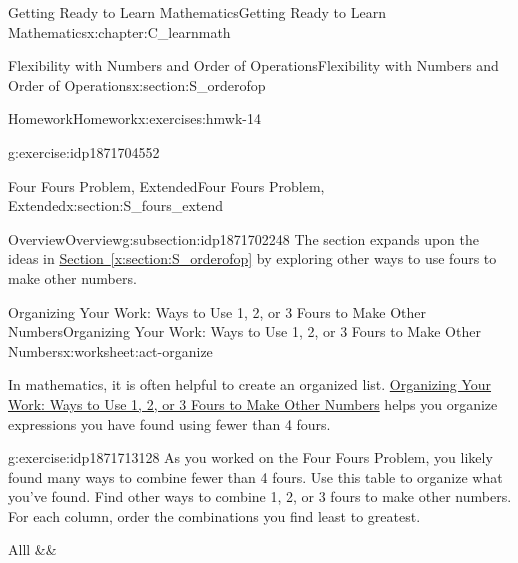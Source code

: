 \documentclass[oneside,10pt,]{book}
\newcommand{\tabularfont}{\relax}
\newcommand{\xreffont}{\relax}
\numberwithin{equation}{chapter}
\newcommand{\hrulethin}  {\noalign{\hrule height 0.04em}}
\begin{document}
\begin{chapterptx}{Getting Ready to Learn Mathematics}{}{Getting Ready to Learn Mathematics}{}{}{x:chapter:C_learnmath}
\begin{sectionptx}{Flexibility with Numbers and Order of Operations}{}{Flexibility with Numbers and Order of Operations}{}{}{x:section:S_orderofop}
\begin{exercises-subsection}{Homework}{}{Homework}{}{}{x:exercises:hmwk-14}
\begin{divisionexercise}{8}{}{}{g:exercise:idp1871704552}
\begin{enumerate}[font=\bfseries,label=(\alph*),ref=\alph*]
\end{enumerate}
\end{divisionexercise}%
\end{exercises-subsection}
\end{sectionptx}
%
%
\typeout{************************************************}
\typeout{************************************************}
%
\begin{sectionptx}{Four Fours Problem, Extended}{}{Four Fours Problem, Extended}{}{}{x:section:S_fours_extend}
%
%
\typeout{************************************************}
\typeout{************************************************}
%
\begin{subsectionptx}{Overview}{}{Overview}{}{}{g:subsection:idp1871702248}
The section expands upon the ideas in \hyperref[x:section:S_orderofop]{Section~{\xreffont\ref{x:section:S_orderofop}}} by exploring other ways to use fours to make other numbers.%
\end{subsectionptx}
%
%
\typeout{************************************************}
\typeout{************************************************}
%
\begin{worksheet-subsection}{Organizing Your Work: Ways to Use 1, 2, or 3 Fours to Make Other Numbers}{}{Organizing Your Work: Ways to Use 1, 2, or 3 Fours to Make Other Numbers}{}{}{x:worksheet:act-organize}
\begin{introduction}{}%
In mathematics, it is often helpful to create an organized list. \hyperref[x:worksheet:act-organize]{Organizing Your Work: Ways to Use 1, 2, or 3 Fours to Make Other Numbers} helps you organize expressions you have found using fewer than 4 fours.%
\end{introduction}%
\begin{divisionexercise}{1}{}{}{g:exercise:idp1871713128}%
As you worked on the Four Fours Problem, you likely found many ways to combine fewer than 4 fours. Use this table to organize what you've found. Find other ways to combine 1, 2, or 3 fours to make other numbers. For each column, order the combinations you find least to greatest.%
\begin{center}%
{\tabularfont%
\begin{tabular}{Alll}\hrulethin
{}&&\tabularnewline\hrulethin

\end{tabular}}
\end{center}
\end{divisionexercise}
\end{worksheet-subsection}
\end{sectionptx}
\end{chapterptx}
\end{document}
